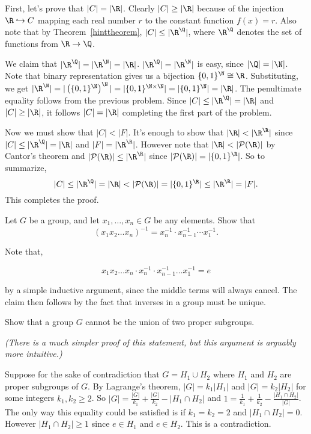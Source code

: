 \documentclass[11pt,letterpaper]{article}
\begin{document}
First, let's prove that $|C| = |\R|$. Clearly $|C| \geq |\R|$ because of the injection $\R \hookrightarrow C$ mapping each real number $r$ to the constant function $f(x)=r$. Also note that by Theorem~\ref{hinttheorem}, $|C|\leq |\R^\Q|$, where $\R^\Q$ denotes the set of functions from $\R \to \Q$. 

We claim that $|\R^\Q| = |\R^\N| = |\R|$. $|\R^\Q| = |\R^\N|$ is easy, since $|\Q|=|\N|$. Note that binary representation gives us a bijection $\{0,1\}^\N \cong \R$. Substituting, we get $|\R^\N|=|\left(\{0,1\}^\N\right)^\N|=|\{0,1\}^{\N\times\N}|=|\{0,1\}^\N|=|\R|$. The penultimate equality follows from the previous problem. Since $|C|\leq |\R^\Q| = |\R|$ and $|C|\geq |\R|$, it follows $|C|=|\R|$ completing the first part of the problem.

Now we must show that $|C|<|F|$. It's enough to show that $|\R| < |\R^\R|$ since $|C|\leq |\R^\Q|=|\R|$ and $|F|=|\R^\R|$. However note that $|\R|<|\mathcal{P}(\R)|$ by Cantor's theorem and $|\mathcal{P}(\R)|\leq |\R^\R|$ since $|\mathcal{P}(\R)|=|\{0,1\}^\R|$. So to summarize,
\[|C|\leq |\R^\Q| = |\R| < |\mathcal{P}(\R)|=|\{0,1\}^\R|\leq |\R^\R| = |F|.\]
This completes the proof.   

\pagebreak
\begin{problem}
  Let $G$ be a group, and let $x_1,\dots,x_n\in G$ be any elements. Show that $$(x_1x_2\dots x_n)^{-1}=x_n^{-1}\cdot x_{n-1}^{-1}\cdots x_1^{-1}.$$
\end{problem}

Note that,

\[ x_1 x_2 \ldots x_n\cdot x_n^{-1}\cdot x_{n-1}^{-1}\ldots x_1^{-1} = e\]

by a simple inductive argument, since the middle terms will always cancel. The claim then follows by the fact that inverses in a group must be unique.

\pagebreak
\begin{problem}
  Show that a group $G$ cannot be the union of two proper subgroups.
\end{problem}

\textit{(There is a much simpler proof of this statement, but this argument is arguably more intuitive.)}

Suppose for the sake of contradiction that $G=H_1\cup H_2$ where $H_1$ and $H_2$ are proper subgroups of $G$. By Lagrange's theorem, $|G|=k_1|H_1|$ and $|G|=k_2|H_2|$ for some integers $k_1,k_2\geq 2$. So $|G|=\frac{|G|}{k_1} + \frac{|G|}{k_2} - |H_1\cap H_2|$ and $1 =\frac{1}{k_1}+\frac{1}{k_2}-\frac{|H_1\cap H_2|}{|G|}$. The only way this equality could be satisfied is if $k_1=k_2=2$ and $|H_1\cap H_2|=0$. However $|H_1\cap H_2|\geq 1$ since $e\in H_1$ and $e\in H_2$. This is a contradiction.
\end{document}
